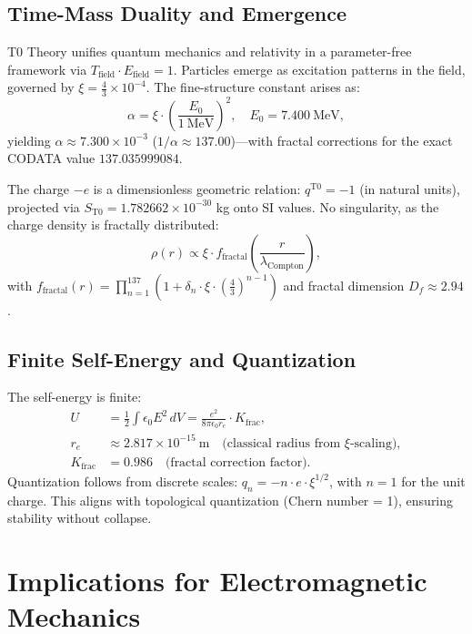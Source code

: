 \documentclass[12pt,a4paper]{article}
\begin{document}
	\subsection{Time-Mass Duality and Emergence}
	T0 Theory unifies quantum mechanics and relativity in a parameter-free framework via $T_{\text{field}} \cdot E_{\text{field}} = 1$. Particles emerge as excitation patterns in the field, governed by $\xi = \frac{4}{3} \times 10^{-4}$. The fine-structure constant arises as:
	\begin{equation}
		\alpha = \xi \cdot \left( \frac{E_0}{1~\mathrm{MeV}} \right)^2, \quad E_0 = 7.400~\mathrm{MeV},
	\end{equation}
	yielding $\alpha \approx 7.300 \times 10^{-3}$ ($1/\alpha \approx 137.00$)—with fractal corrections for the exact CODATA value $137.035999084$.
	
	The charge $-e$ is a dimensionless geometric relation: $q^{\mathrm{T0}} = -1$ (in natural units), projected via $S_{\mathrm{T0}} = 1.782662 \times 10^{-30}$ kg onto SI values. No singularity, as the charge density is fractally distributed:
	\begin{equation}
		\rho(r) \propto \xi \cdot f_{\text{fractal}}\left( \frac{r}{\lambda_{\text{Compton}}} \right),
	\end{equation}
	with $f_{\text{fractal}}(r) = \prod_{n=1}^{137} \left(1 + \delta_n \cdot \xi \cdot \left(\frac{4}{3}\right)^{n-1}\right)$ and fractal dimension $D_f \approx 2.94$.
	
	\subsection{Finite Self-Energy and Quantization}
	The self-energy is finite:
	\begin{align}
		U &= \frac{1}{2} \int \epsilon_0 E^2 \, dV = \frac{e^2}{8\pi \epsilon_0 r_e} \cdot K_{\text{frac}}, \\
		r_e &\approx 2.817 \times 10^{-15}~\mathrm{m} \quad \text{(classical radius from $\xi$-scaling)}, \\
		K_{\text{frac}} &= 0.986 \quad \text{(fractal correction factor)}.
	\end{align}
	Quantization follows from discrete scales: $q_n = -n \cdot e \cdot \xi^{1/2}$, with $n=1$ for the unit charge. This aligns with topological quantization (Chern number = 1), ensuring stability without collapse.
	
	\section{Implications for Electromagnetic Mechanics}
	\label{sec:emm}
	
\end{document}
